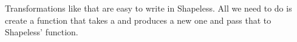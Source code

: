 \begin{example}

\end{example}

\begin{example}

Transformations like that are easy to write in Shapeless. All we need to do
is create a function that takes a  and produces a new one and pass
that to Shapeless'  function.



\end{example}
